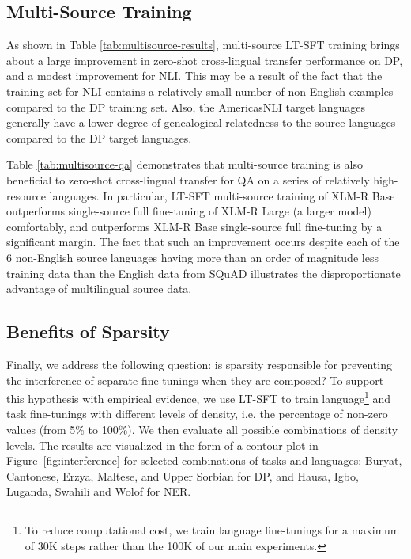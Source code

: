 \subsection{Multi-Source Training}

As shown in Table \ref{tab:multisource-results}, multi-source LT-SFT training brings about a large improvement in zero-shot cross-lingual transfer performance on DP, and a modest improvement for NLI. This may be a result of the fact that the training set for NLI contains a relatively small number of non-English examples compared to the DP training set. Also, the AmericasNLI target languages generally have a lower degree of genealogical relatedness to the source languages compared to the DP target languages.

Table \ref{tab:multisource-qa} demonstrates that multi-source training is also beneficial to zero-shot cross-lingual transfer for QA on a series of relatively high-resource languages. In particular, LT-SFT multi-source training of XLM-R Base outperforms single-source full fine-tuning of XLM-R Large (a larger model) comfortably, and outperforms XLM-R Base single-source full fine-tuning by a significant margin. The fact that such an improvement occurs despite each of the 6 non-English source languages having more than an order of magnitude less training data than the English data from SQuAD illustrates the disproportionate advantage of multilingual source data.

\subsection{Benefits of Sparsity} \label{ssec:sparsity-analysis}
Finally, we address the following question: is sparsity responsible for preventing the interference of separate fine-tunings when they are composed? To support this hypothesis with empirical evidence, we use LT-SFT to train language\footnote{To reduce computational cost, we train language fine-tunings for a maximum of 30K steps rather than the 100K of our main experiments.} and task fine-tunings with different levels of density, i.e. the percentage of non-zero values (from 5\% to 100\%). We then evaluate all possible combinations of density levels. The results are visualized in the form of a contour plot in Figure~\ref{fig:interference} for selected combinations of tasks and languages: Buryat, Cantonese, Erzya, Maltese, and Upper Sorbian for DP, and Hausa, Igbo, Luganda, Swahili and Wolof for NER.

